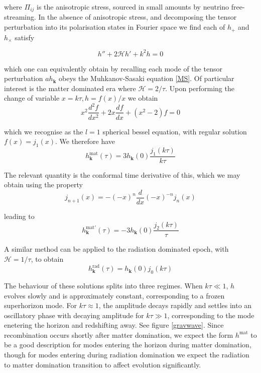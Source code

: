\documentclass[a4paper,10pt]{article}
\renewcommand{\v}[1]{\mathbf{#1}}
\begin{document}
where $\Pi_{ij}$ is the anisotropic stress, sourced in small amounts by neutrino free-streaming. In the absence of anisotropic stress, and decomposing the tensor perturbation into its polarisation states in Fourier space we find each of $h_+$ and $h_\times$ satisfy

\begin{equation}
h''+2\mathcal{H}h'+k^2h = 0
\end{equation}

which one can equivalently obtain by recalling each mode of the tensor perturbation $ah_\v{k}$ obeys the Muhkanov-Sasaki equation \ref{MS}.  Of particular interest is the matter dominated era where $\mathcal{H}=2/\tau$. Upon performing the change of variable $x=k\tau,  h=f(x)/x$ we obtain
\begin{equation}
x^2\frac{d^2f}{dx^2}+2x\frac{df}{dx}+(x^2-2)f=0
\end{equation}

which we recognise as the $l=1$ spherical bessel equation, with regular solution $f(x) = j_1(x)$. We therefore have
\begin{equation}
h^{\text{mat}}_\v{k}(\tau) = 3h_\v{k}(0)\frac{j_1(k\tau)}{k\tau}
\end{equation}

The relevant quantity is the conformal time derivative of this, which we may obtain using the property
\begin{equation}
j_{n+1}(x)=-(-x)^n\frac{d}{dx}(-x)^{-n}j_n(x)
\end{equation}

leading to 
\begin{equation}
h^{\text{mat}'}_\v{k}(\tau) = -3h_\v{k}(0)\frac{j_2(k\tau)}{\tau}
\end{equation}

A similar method can be applied to the radiation dominated epoch, with $\mathcal{H}=1/\tau$, to obtain
\begin{equation}
h^{\text{rad}}_\v{k}(\tau) = h_\v{k}(0)j_0({k\tau})
\end{equation}

The behaviour of these solutions splits into three regimes. When $k\tau\ll 1$, $h$ evolves slowly and is approximately constant, corresponding to a frozen superhorizon mode. For $k\tau\approx1$, the amplitude decays rapidly and settles into an oscillatory phase with decaying amplitude for $k\tau \gg 1$, corresponding to the mode enetering the horizon and redshifting away. See figure \ref{gravwave}. Since recombination occurs shortly after matter domination, we expect the form $h^{\text{mat}}$ to be a good description for modes entering the horizon during matter domination, though for modes entering during radiation domination we expect the radiation to matter domination transition to affect evolution significantly.\\
\end{document}
